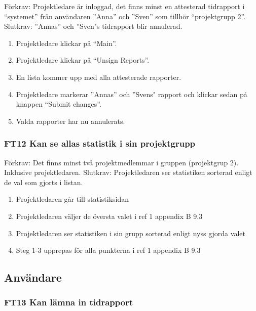 \documentclass[paper=a4, fontsize=11pt,twoside]{article}
\begin{document}
		Förkrav: Projektledare är inloggad, det finns minst en attesterad tidrapport i
		“systemet” från användaren  ”Anna” och ”Sven” som tillhör “projektgrupp 2”.
		\newline
		Slutkrav: ”Annas” och ”Sven"s tidrapport blir annulerad.
		
		\begin{enumerate}
		 \item Projektledare klickar på “Main”.
		 \item Projektledare klickar på “Unsign Reports”.
		 \item En lista kommer upp med alla attesterade rapporter.
		 \item Projektledare markerar ”Annas” och ”Svens" rapport och klickar sedan på
		 knappen “Submit changes”.
		  \item Valda rapporter har nu annulerats.
		  
		\end{enumerate}
		
		\subsubsection*{FT12 Kan se allas statistik i sin projektgrupp}
		
		Förkrav: Det finns minst två projektmedlemmar i gruppen (projektgrup 2).
		Inklusive projektledaren.
		\newline
		Slutkrav: Projektledaren ser statistiken sorterad enligt de val som gjorts i listan.
		\begin{enumerate}
		\item Projektledaren går till statistiksidan
		\item Projektledaren väljer de översta valet i ref 1 appendix B 9.3
		\item Projektledaren ser statistiken i sin grupp sorterad enligt nyss gjorda
		valet 
		\item Steg 1-3 upprepas för alla punkterna i ref 1 appendix B 9.3
		
		\end{enumerate}		
		
		\subsection{Användare}
		
		\subsubsection*{FT13 Kan lämna in tidrapport}
		
\end{document}
